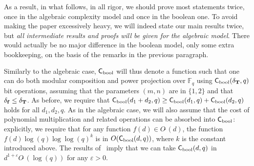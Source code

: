 \documentclass[12pt]{article}
\def\CC {\ensuremath{\mathsf{C}}}
\def\F {\ensuremath{\mathbb{F}}}
\def\Tt {\ensuremath{\mathbf{T}}}
\def\Ot {O\tilde{~}}
\begin{document}
As a result, in what follows, in all rigor, we should prove most
statements twice, once in the algebraic complexity model and once in
the boolean one. To avoid making the paper excessively heavy, we will
indeed state our main results twice, but {\em all intermediate results
  and proofs will be given for the algebraic model}. There would
actually be no major difference in the boolean model, only some extra
bookkeeping, on the basis of the remarks in the previous paragraph.

Similarly to the algebraic case, $\CC_{\rm bool}$ will thus denote a
function such that one can do both modular composition and power
projection over $\F_q$ using $\CC_{\rm bool}(\delta_\Tt,q)$ bit
operations, assuming that the parameters $(m,n)$ are in
$\{1,2\}$ and that $\delta_{\bf f} \le \delta_\Tt$. As before, we require
that $\CC_{\rm bool}(d_1 + d_2,q) \ge \CC_{\rm bool}(d_1,q)+\CC_{\rm
  bool}(d_2,q)$ holds for all $d_1,d_2,q$. As in the algebraic case,
we will also assume that the cost of polynomial multiplication and
related operations can be absorbed into $\CC_{\rm bool}$: explicitly,
we require that for any function $f(d) \in \Ot(d)$, the function
$f(d)\log(q)\log\log(q)^k$ is in $O(\CC_{\rm bool}(d,q))$, where $k$
is the constant introduced above. The results of~\cite{PoSc10} imply
that we can take $\CC_{\rm bool}(d,q)$ in
$d^{1+\varepsilon}\Ot(\log(q))$ for any $\varepsilon>0$.
\end{document}
